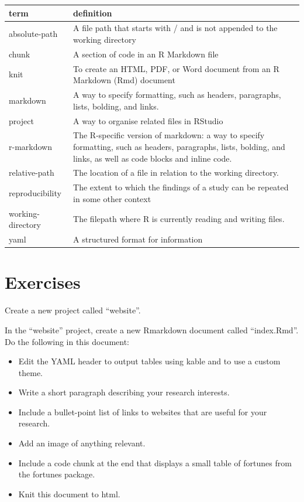 \documentclass[
  oneside]{book}
\providecommand{\tightlist}{%
  \setlength{\itemsep}{0pt}\setlength{\parskip}{0pt}}
\begin{document}
\begin{tabular}{l|l}
\hline
term & definition\\
\hline
absolute-path & A file path that starts with / and is not appended to the working directory\\
\hline
chunk & A section of code in an R Markdown file\\
\hline
knit & To create an HTML, PDF, or Word document from an R Markdown (Rmd) document\\
\hline
markdown & A way to specify formatting, such as headers, paragraphs, lists, bolding, and links.\\
\hline
project & A way to organise related files in RStudio\\
\hline
r-markdown & The R-specific version of markdown: a way to specify formatting, such as headers, paragraphs, lists, bolding, and links, as well as code blocks and inline code.\\
\hline
relative-path & The location of a file in relation to the working directory.\\
\hline
reproducibility & The extent to which the findings of a study can be repeated in some other context\\
\hline
working-directory & The filepath where R is currently reading and writing files.\\
\hline
yaml & A structured format for information\\
\hline
\end{tabular}

\hypertarget{exercises-repro}{%
\section{Exercises}\label{exercises-repro}}

Create a new project called ``website''.

In the ``website'' project, create a new Rmarkdown document called ``index.Rmd''. Do the following in this document:

\begin{itemize}
\tightlist
\item
  Edit the YAML header to output tables using kable and to use a custom theme.
\item
  Write a short paragraph describing your research interests.
\item
  Include a bullet-point list of links to websites that are useful for your research.
\item
  Add an image of anything relevant.
\item
  Include a code chunk at the end that displays a small table of fortunes from the fortunes package.
\item
  Knit this document to html.
\end{itemize}
\end{document}
